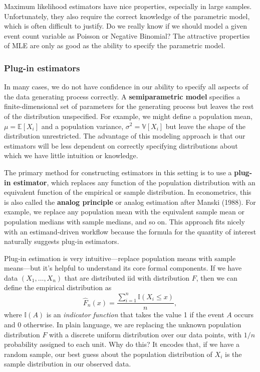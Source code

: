 \documentclass[
  13pt,
  letterpaper,
  DIV=11,
  numbers=noendperiod]{scrreprt}
\newcommand{\E}{\mathbb{E}}
\newcommand{\V}{\mathbb{V}}
\theoremstyle{plain}
\theoremstyle{plain}
\theoremstyle{definition}
\theoremstyle{definition}
\theoremstyle{remark}
\begin{document}
Maximum likelihood estimators have nice properties, especially in large
samples. Unfortunately, they also require the correct knowledge of the
parametric model, which is often difficult to justify. Do we really know
if we should model a given event count variable as Poisson or Negative
Binomial? The attractive properties of MLE are only as good as the
ability to specify the parametric model.

\subsubsection{Plug-in estimators}\label{plug-in-estimators}

In many cases, we do not have confidence in our ability to specify all
aspects of the data generating process correctly. A
\textbf{semiparametric model} specifies a finite-dimensional set of
parameters for the generating process but leaves the rest of the
distribution unspecified. For example, we might define a population
mean, \(\mu = \E[X_i]\) and a population variance,
\(\sigma^2 = \V[X_i]\) but leave the shape of the distribution
unrestricted. The advantage of this modeling approach is that our
estimators will be less dependent on correctly specifying distributions
about which we have little intuition or knowledge.

The primary method for constructing estimators in this setting is to use
a \textbf{plug-in estimator}, which replaces any function of the
population distribution with an equivalent function of the empirical or
sample distribution. In econometrics, this is also called the
\textbf{analog principle} or analog estimation after Manski (1988). For
example, we replace any population mean with the equivalent sample mean
or population medians with sample medians, and so on. This approach fits
nicely with an estimand-driven workflow because the formula for the
quantity of interest naturally suggests plug-in estimators.

Plug-in estimation is very intuitive---replace population means with
sample means---but it's helpful to understand its core formal
components. If we have data \((X_1, \ldots, X_n)\) that are distributed
iid with distribution \(F\), then we can define the empirical
distribution as \[
\widehat{F}_n(x) = \frac{\sum_{i=1}^n \mathbb{I}(X_i \leq x)}{n},
\] where \(\mathbb{I}(A)\) is an \emph{indicator function} that takes
the value 1 if the event \(A\) occurs and 0 otherwise. In plain
language, we are replacing the unknown population distribution \(F\)
with a discrete uniform distribution over our data points, with \(1/n\)
probability assigned to each unit. Why do this? It encodes that, if we
have a random sample, our best guess about the population distribution
of \(X_i\) is the sample distribution in our observed data.
\end{document}
